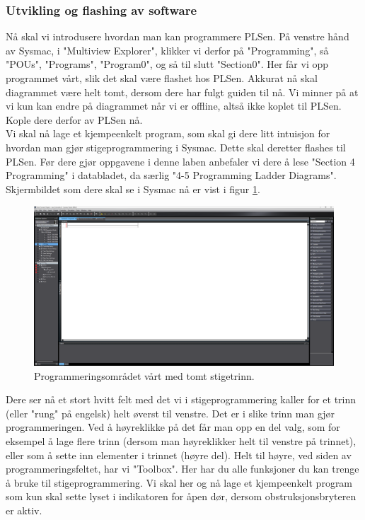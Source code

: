\begin{alphasection}
\subsubsection{Utvikling og flashing av software}
Nå skal vi introdusere hvordan man kan programmere PLSen. På venstre hånd av Sysmac, i "Multiview Explorer", klikker vi derfor på "Programming", så "POUs", "Programs", "Program0", og så til slutt "Section0". Her får vi opp programmet vårt, slik det skal være flashet hos PLSen. Akkurat nå skal diagrammet være helt tomt, dersom dere har fulgt guiden til nå. Vi minner på at vi kun kan endre på diagrammet når vi er offline, altså ikke koplet til PLSen. Kople dere derfor av PLSen nå. \\

Vi skal nå lage et kjempeenkelt program, som skal gi dere litt intuisjon for hvordan man gjør stigeprogrammering i Sysmac. Dette skal deretter flashes til PLSen. Før dere gjør oppgavene i denne laben anbefaler vi dere å lese "Section 4 Programming" i databladet, da særlig "4-5 Programming Ladder Diagrams". Skjermbildet som dere skal se i Sysmac nå er vist i figur \ref{fig:empty_rung}.

\begin{figure}[ht]
    \centering
    \hspace*{-2cm}
    \includegraphics[scale=0.275]{figures/empty_rung.png}
    \caption{Programmeringsområdet vårt med tomt stigetrinn.}
    \label{fig:empty_rung}
\end{figure}

Dere ser nå et stort hvitt felt med det vi i stigeprogrammering kaller for et trinn (eller "rung" på engelsk) helt øverst til venstre. Det er i slike trinn man gjør programmeringen. Ved å høyreklikke på det får man opp en del valg, som for eksempel å lage flere trinn (dersom man høyreklikker helt til venstre på trinnet), eller som å sette inn elementer i trinnet (høyre del). Helt til høyre, ved siden av programmeringsfeltet, har vi "Toolbox". Her har du alle funksjoner du kan trenge å bruke til stigeprogrammering. Vi skal her og nå lage et kjempeenkelt program som kun skal sette lyset i indikatoren for åpen dør, dersom obstruksjonsbryteren er aktiv.\\


\end{alphasection}
